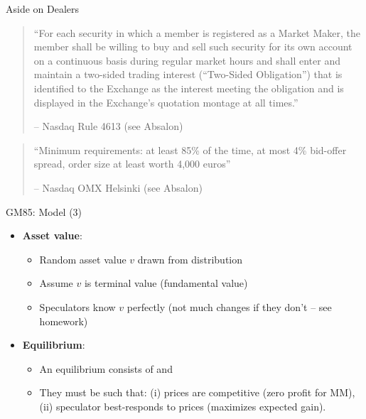 \documentclass[english,10pt]{beamer}
\begin{document}
\begin{frame}{Aside on Dealers}
	\begin{quotation}
		\small ``For each security in which a member is registered as a Market Maker, the member shall be willing to buy and sell such security for its own account on a continuous basis during regular market hours and shall enter and maintain a two-sided trading interest (``Two-Sided Obligation'') that is identified to the Exchange as the interest meeting the obligation and is displayed in the Exchange's quotation montage at all times.''
		\begin{flushright}
			-- Nasdaq Rule 4613 (see Absalon)
		\end{flushright}
	\end{quotation}
	\vspace{3ex}
	\begin{quotation}
		\small ``Minimum requirements: at least 85\% of the time, at most 4\% bid-offer
		spread, order size at least worth 4,000 euros''
		\begin{flushright}
			-- Nasdaq OMX Helsinki (see Absalon)
		\end{flushright}
	\end{quotation}
\end{frame}


\begin{frame}{GM85: Model (3)}
\begin{itemize}
	\item \textbf{Asset value}:
	\begin{itemize}
		\item Random asset value $v$ drawn from distribution
		\item Assume $v$ is terminal value (fundamental value)
		\item Speculators know $v$ perfectly (not much changes if they don't -- see homework)
	\end{itemize}
	\item \textbf{Equilibrium}:
	\begin{itemize}
		\item An equilibrium consists of  and 
		\item They must be such that: (i) prices are competitive (zero profit for MM), (ii) speculator best-responds to prices (maximizes expected gain).
	\end{itemize}
\end{itemize}
\end{frame}
\end{document}
